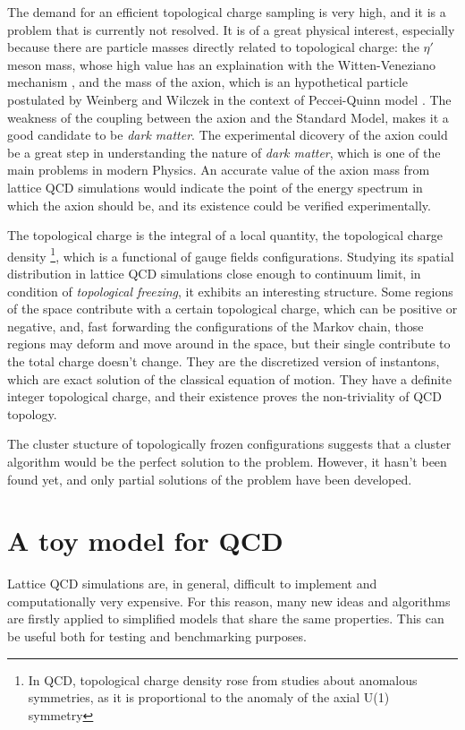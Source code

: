 The demand for an efficient topological charge sampling is very high, and it is a problem that is currently not resolved.
It is of a great physical interest, especially because there are particle masses directly related to topological charge:
the $\eta'$ meson mass, whose high value has an explaination with the Witten-Veneziano mechanism \cite{witten:1979-1, witten:1979-2, veneziano:1979},
and the mass of the axion, which is an hypothetical particle postulated by Weinberg \cite{weinberg:1978} and Wilczek \cite{wilczek:1978}
in the context of Peccei-Quinn model \cite{peccei-quinn:1977-1, peccei-quinn:1977-2}.
The weakness of the coupling between the axion and the Standard Model, makes it a good candidate to be \emph{dark matter}.
The experimental dicovery of the axion could be a great step in understanding the nature of \emph{dark matter}, which is one of the main problems in modern Physics.
An accurate value of the axion mass from lattice QCD simulations would indicate the point of the energy spectrum in which the axion should be,
and its existence could be verified experimentally.

The topological charge is the integral of a local quantity, the topological charge density%
\footnote{In QCD, topological charge density rose from studies about anomalous symmetries, as it is proportional to the anomaly of the axial U(1) symmetry},
which is a functional of gauge fields configurations.
Studying its spatial distribution in lattice QCD simulations close enough to continuum limit, in condition of \emph{topological freezing}, it exhibits an interesting structure.
Some regions of the space contribute with a certain topological charge, which can be positive or negative, and,
fast forwarding the configurations of the Markov chain,
those regions may deform and move around in the space, but their single contribute to the total charge doesn't change.
They are the discretized version of instantons, which are exact solution of the classical equation of motion.
They have a definite integer topological charge, and their existence proves the non-triviality of QCD topology.

The cluster stucture of topologically frozen configurations suggests that a cluster algorithm would be the perfect solution to the problem.
However, it hasn't been found yet, and only partial solutions of the problem have been developed.%

\section*{A toy model for QCD}
Lattice QCD simulations are, in general, difficult to implement and computationally very expensive.
For this reason, many new ideas and algorithms are firstly applied to simplified models that share the same properties.
This can be useful both for testing and benchmarking purposes.

